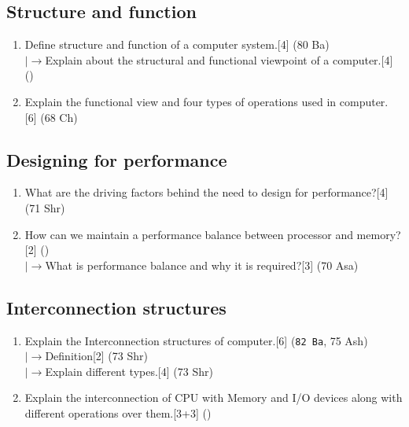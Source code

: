 \documentclass[12pt]{article}
\newcommand{\lb}{\\$\left|\rightarrow\right.$}
\begin{document}
	\subsection{Structure and function}
	\begin{enumerate}[noitemsep, topsep = 0pt]
	\item Define structure and function of a computer system.\hfill[4] (80 Ba)
	\lb Explain about the structural and functional viewpoint of a computer.\hfill[4] ()
	\item Explain the functional view and four types of operations used in computer. \hfill[6] (68 Ch)
	\end{enumerate}
	\subsection{Designing for performance}
	\begin{enumerate}[noitemsep, topsep = 0pt]
	\item What are the driving factors behind the need to design for performance?\hfill[4] (71 Shr)
	\item How can we maintain a performance balance between processor and memory?\hfill[2] ()
	\lb What is performance balance and why it is required?\hfill[3] (70 Asa)
	\end{enumerate}
	\subsection{Interconnection structures}
	\begin{enumerate}[noitemsep, topsep = 0pt]
	\item Explain the Interconnection structures of computer.\hfill [6] (\texttt{82 Ba}, 75 Ash)\
	\lb Definition\hfill[2] (73 Shr)
	\lb Explain different types.\hfill[4] (73 Shr)
	\item Explain the interconnection of CPU with Memory and I/O devices along with different operations over them.\hfill[3+3] ()
	\end{enumerate}
\end{document}
